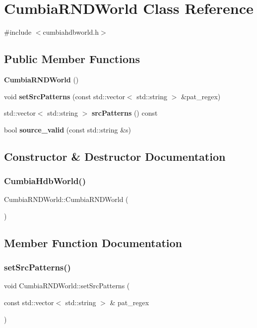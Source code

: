 \section{Cumbia\+R\+N\+D\+World Class Reference}
\label{classCumbiaHdbWorld}


{\ttfamily \#include $<$cumbiahdbworld.\+h$>$}

\subsection*{Public Member Functions}
\begin{DoxyCompactItemize}
\item 
\textbf{ Cumbia\+R\+N\+D\+World} ()
\item 
void \textbf{ set\+Src\+Patterns} (const std\+::vector$<$ std\+::string $>$ \&pat\+\_\+regex)
\item 
std\+::vector$<$ std\+::string $>$ \textbf{ src\+Patterns} () const
\item 
bool \textbf{ source\+\_\+valid} (const std\+::string \&s)
\end{DoxyCompactItemize}


\subsection{Constructor \& Destructor Documentation}
\mbox{\label{classCumbiaHdbWorld_a38a662c4a616c023f8e86afa2abf3850}} 
\subsubsection{CumbiaHdbWorld()}
{\footnotesize\ttfamily Cumbia\+R\+N\+D\+World\+::\+Cumbia\+R\+N\+D\+World (\begin{DoxyParamCaption}{ }\end{DoxyParamCaption})}



\subsection{Member Function Documentation}
\mbox{\label{classCumbiaHdbWorld_a46f74c8ce3ac7e4acde2a4e28fd4aa5b}} 
\subsubsection{setSrcPatterns()}
{\footnotesize\ttfamily void Cumbia\+R\+N\+D\+World\+::set\+Src\+Patterns (\begin{DoxyParamCaption}\item[{const std\+::vector$<$ std\+::string $>$ \&}]{pat\+\_\+regex }\end{DoxyParamCaption})}

